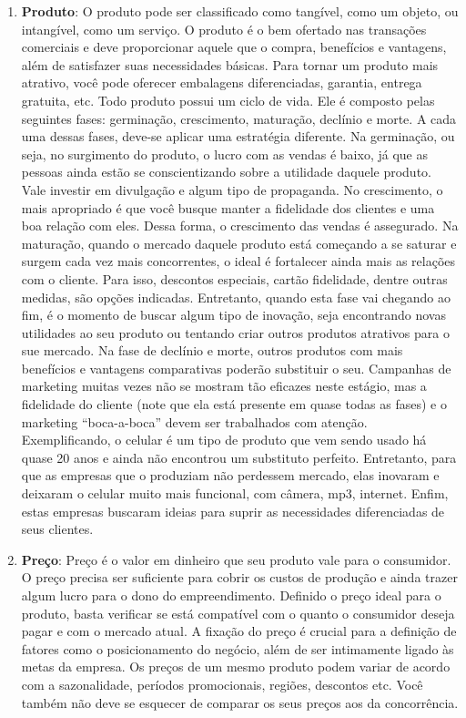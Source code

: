 \documentclass[
	12pt,				%
	openright,			%
	oneside,			%
	a4paper,			%
	english,			%
	french,				%
	spanish,			%
	brazil				%
	]{abntex2}
\begin{document}
	\begin{enumerate}
		\item \textbf{Produto}: O produto pode ser classificado como tangível, como um objeto, ou intangível, como um serviço. O produto é o bem ofertado nas transações comerciais e deve proporcionar aquele que o compra, benefícios e vantagens, além de satisfazer suas necessidades básicas. Para tornar um produto mais atrativo, você pode oferecer embalagens diferenciadas, garantia, entrega gratuita, etc. Todo produto possui um ciclo de vida. Ele é composto pelas seguintes fases: germinação, crescimento, maturação, declínio e morte. A cada uma dessas fases, deve-se aplicar uma estratégia diferente. Na germinação, ou seja, no surgimento do produto, o lucro com as vendas é baixo, já que as pessoas ainda estão se conscientizando sobre a utilidade daquele produto. Vale investir em divulgação e algum tipo de propaganda. No crescimento, o mais apropriado é que você busque manter a fidelidade dos clientes e uma boa relação com eles. Dessa forma, o crescimento das vendas é assegurado. Na maturação, quando o mercado daquele produto está começando a se saturar e surgem cada vez mais concorrentes, o ideal é fortalecer ainda mais as relações com o cliente. Para isso, descontos especiais, cartão fidelidade, dentre outras medidas, são opções indicadas. Entretanto, quando esta fase vai chegando ao fim, é o momento de buscar algum tipo de inovação, seja encontrando novas utilidades ao seu produto ou tentando criar outros produtos atrativos para o sue mercado. Na fase de declínio e morte, outros produtos com mais benefícios e vantagens comparativas poderão substituir o seu. Campanhas de marketing muitas vezes não se mostram tão eficazes neste estágio, mas a fidelidade do cliente (note que ela está presente em quase todas as fases) e o marketing “boca-a-boca” devem ser trabalhados com atenção. Exemplificando, o celular é um tipo de produto que vem sendo usado há quase 20 anos e ainda não encontrou um substituto perfeito. Entretanto, para que as empresas que o produziam não perdessem mercado, elas inovaram e deixaram o celular muito mais funcional, com câmera, mp3, internet. Enfim, estas empresas buscaram ideias para suprir as necessidades diferenciadas de seus clientes.
		\item \textbf{Preço}: Preço é o valor em dinheiro que seu produto vale para o consumidor. O preço precisa ser suficiente para cobrir os custos de produção e ainda trazer algum lucro para o dono do empreendimento. Definido o preço ideal para o produto, basta verificar se está compatível com o quanto o consumidor deseja pagar e com o mercado atual. A fixação do preço é crucial para a definição de fatores como o posicionamento do negócio, além de ser intimamente ligado às metas da empresa. Os preços de um mesmo produto podem variar de acordo com a sazonalidade, períodos promocionais, regiões, descontos etc. Você também não deve se esquecer de comparar os seus preços aos da concorrência.

\end{enumerate}
\end{document}
